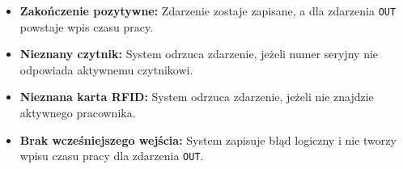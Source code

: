 \begin{itemize}
    \begin{itemize}
        \item \textbf{Zakończenie pozytywne:} Zdarzenie zostaje zapisane, a dla zdarzenia \texttt{OUT} powstaje wpis czasu pracy.
        \item \textbf{Nieznany czytnik:} System odrzuca zdarzenie, jeżeli numer seryjny nie odpowiada aktywnemu czytnikowi.
        \item \textbf{Nieznana karta RFID:} System odrzuca zdarzenie, jeżeli nie znajdzie aktywnego pracownika.
        \item \textbf{Brak wcześniejszego wejścia:} System zapisuje błąd logiczny i nie tworzy wpisu czasu pracy dla zdarzenia \texttt{OUT}.
    \end{itemize}
\end{itemize}

